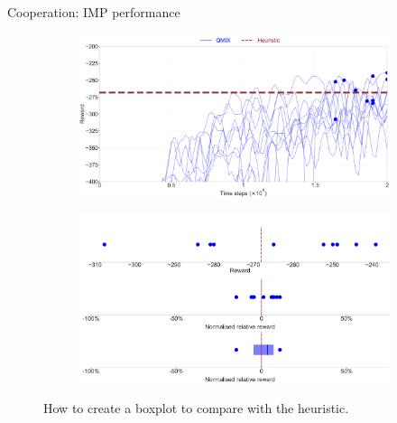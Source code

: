 \documentclass[9pt, hyperref={pdfusetitle,colorlinks=true,allcolors=DarkBlue}]{beamer}
\begin{document}
\begin{frame}{Cooperation: IMP performance} %

\captionsetup{font=scriptsize}
\begin{figure}
    \centering
\begin{subfigure}[t]{0.9\textwidth}
\centering
    \includegraphics[width=.6\linewidth]{plot_explain_top.png}
\end{subfigure}
%
\begin{subfigure}[t]{0.9\textwidth}
\centering
    \includegraphics[width=.6\linewidth]{plot_explain_bottom.png}
    \label{fig:env_categories_3}
\end{subfigure}
\caption{How to create a boxplot to compare with the heuristic.}
\label{fig:imp_results}
\end{figure}
\end{frame}
\end{document}
